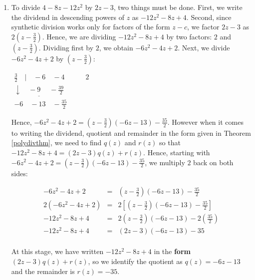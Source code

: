 \documentclass{ximera}
\begin{document}
\begin{example}
\begin{enumerate}
We get the quotient $q(t) = t^2-2t+4$ and the remainder $r(t) =0$. Relating the dividend, quotient and remainder gives: $t^3+8 = (t+2)\left( t^2-2t+4 \right)$, which is a specific instance of the `sum of cubes' formula some of you may recall from Intermediate Algebra.  

\item To divide $4-8z-12z^2$ by $2z-3$, two things must be done.  First, we write the dividend in descending powers of $z$ as $-12z^2-8z+4$.  Second, since synthetic division works only for factors of the form $z-c$, we factor $2z-3$ as $2\left(z-\frac{3}{2}\right)$.  Hence, we are dividing  $-12z^2-8z+4$ by two factors:  $2$ and $\left(z-\frac{3}{2}\right)$.  Dividing first by $2$, we obtain $-6z^2-4z+2$.  Next, we divide  $-6z^2-4z+2$ by $\left(z-\frac{3}{2}\right)$:

\begin{center}
$
\begin{array}{r}
 \frac{3}{2} \quad |\quad -6 \quad-4 \quad\quad\quad 2 \\
 \underline{\downarrow \quad  -9\phantom{.} \quad -\frac{39}{2}}\\
-6 \quad -13 \quad -\frac{35}{2}
\end{array}
$    
\end{center}


Hence,  $-6z^2-4z+2 = \left(z-\frac{3}{2}\right)(-6 z - 13) - \frac{35}{2}$.  However when it comes to writing  the dividend, quotient and remainder in the form given in Theorem \ref{polydivthm}, we need to find $q(z)$ and $r(z)$ so that  $-12z^2-8z+4 = (2z-3) q(z) + r(z)$. Hence, starting with $-6z^2-4z+2 = \left(z-\frac{3}{2}\right)(-6 z - 13) - \frac{35}{2}$, we multiply $2$ back on both sides:  

\[ \begin{array}{rcl}
 -6z^2-4z+2  & = & \left(z-\frac{3}{2}\right)(-6 z - 13) - \frac{35}{2}\\
 2\left(-6z^2-4z+2 \right) & = & 2 \left[ \left(z-\frac{3}{2}\right)(-6 z - 13) - \frac{35}{2} \right] \\
 -12z^2-8z+4 & = & 2 \left(z-\frac{3}{2}\right)(-6 z - 13) - 2 \left(\frac{35}{2} \right) \\
 -12z^2-8z+4 & = & (2z-3) (-6 z - 13) - 35  \\ \end{array} \]

 At this stage, we have written $-12z^2-8z+4$ in the \textbf{form} $(2z-3) q(z) + r(z)$, so we identify the quotient as  $q(z) = -6z-13$ and the remainder is $r(z) = -35$.  
 

\end{enumerate}
\end{example}
\end{document}
